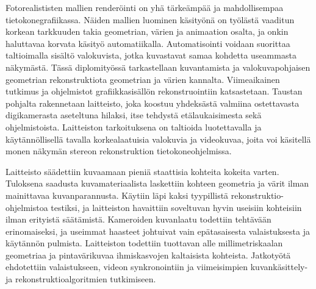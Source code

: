 \begin{abstractpage}[finnish]
Fotorealististen mallien renderöinti on yhä tärkeämpää ja mahdollisempaa tietokonegrafiikassa.
Näiden mallien luominen käsityönä on työlästä vaaditun korkean tarkkuuden takia geometrian, värien ja animaation osalta, ja onkin haluttavaa korvata käsityö automatiikalla.
Automatisointi voidaan suorittaa taltioimalla sisältö valokuvista, jotka kuvastavat samaa kohdetta useammasta näkymästä.
Tässä diplomityössä tarkastellaan kuvantamista ja valokuvapohjaisen geometrian rekonstruktiota geometrian ja värien kannalta.
Viimeaikainen tutkimus ja ohjelmistot grafiikkasisällön rekonstruointiin katsastetaan.
Taustan pohjalta rakennetaan laitteisto, joka koostuu yhdeksästä valmiina ostettavasta digikamerasta aseteltuna hilaksi, itse tehdystä etälaukaisimesta sekä ohjelmistoista.
Laitteiston tarkoituksena on taltioida luotettavalla ja käytännöllisellä tavalla korkealaatuisia valokuvia ja videokuvaa, joita voi käsitellä monen näkymän stereon rekonstruktion tietokoneohjelmissa.

Laitteisto säädettiin kuvaamaan pieniä staattisia kohteita kokeita varten.
Tuloksena saadusta kuvamateriaalista laskettiin kohteen geometria ja värit ilman mainittavaa kuvanparannusta.
Käytiin läpi kaksi tyypillistä rekonstruktio-ohjelmistoa testiksi, ja laitteiston havaittiin soveltuvan hyvin useisiin kohteisiin ilman erityistä säätämistä.
Kameroiden kuvanlaatu todettiin tehtävään erinomaiseksi, ja useimmat haasteet johtuivat vain epätasaisesta valaistuksesta ja käytännön pulmista.
Laitteiston todettiin tuottavan alle millimetriskaalan geometriaa ja pintavärikuvaa ihmiskasvojen kaltaisista kohteista.
Jatkotyötä ehdotettiin valaistukseen, videon synkronointiin ja viimeisimpien kuvankäsittely- ja rekonstruktioalgoritmien tutkimiseen.
\end{abstractpage}

